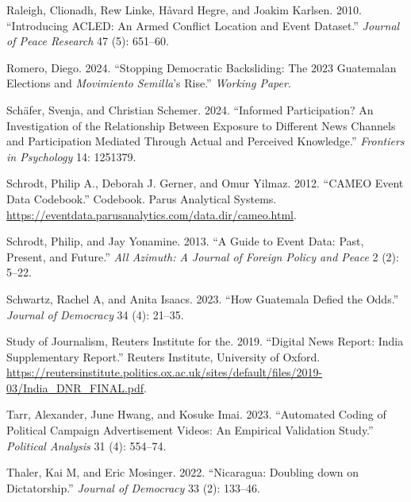 \documentclass[
  letterpaper,
  DIV=11,
  numbers=noendperiod]{scrartcl}
\newlength{\cslhangindent}
\newlength{\cslentryspacingunit} %
\newenvironment{CSLReferences}[2] %
 {%
  \setlength{\parindent}{0pt}
  \ifodd #1
  \let\oldpar\par
  \def\par{\hangindent=\cslhangindent\oldpar}
  \fi
  \setlength{\parskip}{#2\cslentryspacingunit}
 }%
 {}
\begin{document}
\begin{CSLReferences}{1}{0}
\leavevmode{}%
Raleigh, Clionadh, Rew Linke, Håvard Hegre, and Joakim Karlsen. 2010.
{``Introducing ACLED: An Armed Conflict Location and Event Dataset.''}
\emph{Journal of Peace Research} 47 (5): 651--60.

\leavevmode{}%
Romero, Diego. 2024. {``Stopping Democratic Backsliding: The 2023
Guatemalan Elections and \emph{Movimiento Semilla}'s Rise.''}
\emph{Working Paper}.

\leavevmode{}%
Schäfer, Svenja, and Christian Schemer. 2024. {``Informed Participation?
An Investigation of the Relationship Between Exposure to Different News
Channels and Participation Mediated Through Actual and Perceived
Knowledge.''} \emph{Frontiers in Psychology} 14: 1251379.

\leavevmode{}%
Schrodt, Philip A., Deborah J. Gerner, and Omur Yilmaz. 2012. {``{CAMEO}
Event Data Codebook.''} Codebook. Parus Analytical Systems.
\url{https://eventdata.parusanalytics.com/data.dir/cameo.html}.

\leavevmode{}%
Schrodt, Philip, and Jay Yonamine. 2013. {``A Guide to Event Data: Past,
Present, and Future.''} \emph{All Azimuth: A Journal of Foreign Policy
and Peace} 2 (2): 5--22.

\leavevmode{}%
Schwartz, Rachel A, and Anita Isaacs. 2023. {``How Guatemala Defied the
Odds.''} \emph{Journal of Democracy} 34 (4): 21--35.

\leavevmode{}%
Study of Journalism, Reuters Institute for the. 2019. {``Digital News
Report: India Supplementary Report.''} Reuters Institute, University of
Oxford.
\url{https://reutersinstitute.politics.ox.ac.uk/sites/default/files/2019-03/India_DNR_FINAL.pdf}.

\leavevmode{}%
Tarr, Alexander, June Hwang, and Kosuke Imai. 2023. {``Automated Coding
of Political Campaign Advertisement Videos: An Empirical Validation
Study.''} \emph{Political Analysis} 31 (4): 554--74.

\leavevmode{}%
Thaler, Kai M, and Eric Mosinger. 2022. {``Nicaragua: Doubling down on
Dictatorship.''} \emph{Journal of Democracy} 33 (2): 133--46.


\end{CSLReferences}
\end{document}
